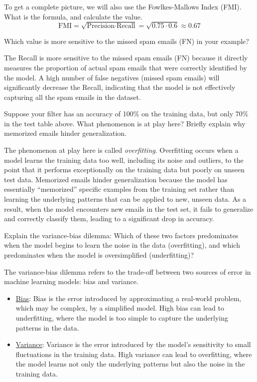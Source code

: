 \begin{ejercicio}
    To get a complete picture, we will also use the Fowlkes-Mallows Index (FMI). What is the formula, and calculate the value.
    \begin{equation*}
        \text{FMI} = \sqrt{\text{Precision} \cdot \text{Recall}} = \sqrt{0.75 \cdot 0.6} \approx 0.67
    \end{equation*}
\end{ejercicio}
\begin{ejercicio}
    Which value is more sensitive to the missed spam emails (FN) in your example?

    The Recall is more sensitive to the missed spam emails (FN) because it directly measures the proportion of actual spam emails that were correctly identified by the model. A high number of false negatives (missed spam emails) will significantly decrease the Recall, indicating that the model is not effectively capturing all the spam emails in the dataset.
\end{ejercicio}
\begin{ejercicio}
    Suppose your filter has an accuracy of 100\% on the training data, but only 70\% in the test table above. What phenomenon is at play here? Briefly explain why memorized emails hinder generalization.

    The phenomenon at play here is called \emph{overfitting}. Overfitting occurs when a model learns the training data too well, including its noise and outliers, to the point that it performs exceptionally on the training data but poorly on unseen test data. Memorized emails hinder generalization because the model has essentially ``memorized'' specific examples from the training set rather than learning the underlying patterns that can be applied to new, unseen data. As a result, when the model encounters new emails in the test set, it fails to generalize and correctly classify them, leading to a significant drop in accuracy.
\end{ejercicio}
\begin{ejercicio}
    Explain the variance-bias dilemma: Which of these two factors predominates when the model begins to learn the noise in the data (overfitting), and which predominates when the model is oversimplified (underfitting)?

    The variance-bias dilemma refers to the trade-off between two sources of error in machine learning models: bias and variance.
    \begin{itemize}
        \item \ul{Bias}: Bias is the error introduced by approximating a real-world problem, which may be complex, by a simplified model. High bias can lead to underfitting, where the model is too simple to capture the underlying patterns in the data.
        \item \ul{Variance}: Variance is the error introduced by the model's sensitivity to small fluctuations in the training data. High variance can lead to overfitting, where the model learns not only the underlying patterns but also the noise in the training data.
    \end{itemize}
\end{ejercicio}
